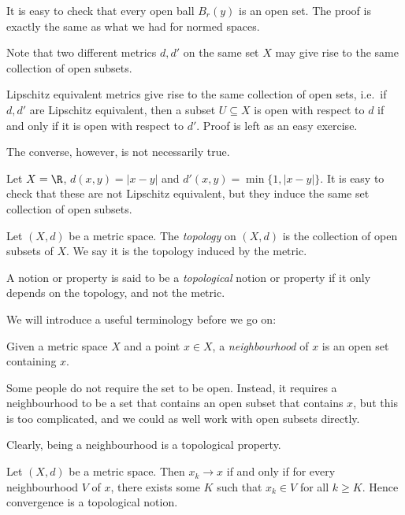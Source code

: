 \documentclass[a4paper]{article}
\begin{document}
It is easy to check that every open ball $B_r(y)$ is an open set. The proof is exactly the same as what we had for normed spaces.

Note that two different metrics $d, d'$ on the same set $X$ may give rise to the same collection of open subsets.
\begin{eg}
  Lipschitz equivalent metrics give rise to the same collection of open sets, i.e.\ if $d, d'$ are Lipschitz equivalent, then a subset $U \subseteq X$ is open with respect to $d$ if and only if it is open with respect to $d'$. Proof is left as an easy exercise.
\end{eg}
The converse, however, is not necessarily true.
\begin{eg}
  Let $X = \R$, $d(x, y) = |x - y|$ and $d'(x, y) = \min\{1, |x - y|\}$. It is easy to check that these are not Lipschitz equivalent, but they induce the same set collection of open subsets.
\end{eg}

\begin{defi}[Topology]
  Let $(X, d)$ be a metric space. The \emph{topology} on $(X, d)$ is the collection of open subsets of $X$. We say it is the topology induced by the metric.
\end{defi}

\begin{defi}
  A notion or property is said to be a \emph{topological} notion or property if it only depends on the topology, and not the metric.
\end{defi}

We will introduce a useful terminology before we go on:

\begin{defi}[Neighbourhood]
  Given a metric space $X$ and a point $x \in X$, a \emph{neighbourhood} of $x$ is an open set containing $x$.
\end{defi}
Some people do not require the set to be open. Instead, it requires a neighbourhood to be a set that contains an open subset that contains $x$, but this is too complicated, and we could as well work with open subsets directly.

Clearly, being a neighbourhood is a topological property.

\begin{prop}
  Let $(X, d)$ be a metric space. Then $x_k \to x$ if and only if for every neighbourhood $V$ of $x$, there exists some $K$ such that $x_k \in V$ for all $k \geq K$. Hence convergence is a topological notion.
\end{prop}
\end{document}
